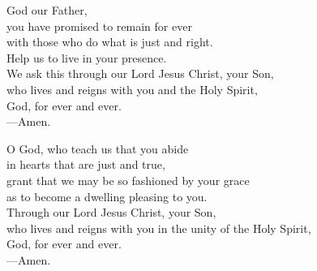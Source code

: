\prayer


\begin{prayerverse}
God our Father,\\
you have promised to remain for ever\\
with those who do what is just and right.\\
Help us to live in your presence.\\
We ask this through our Lord Jesus Christ, your Son,\\
who lives and reigns with you and the Holy Spirit,\\
God, for ever and ever.\\
{\color{red}---\thinspace}Amen.
\end{prayerverse}


\begin{prayerverse}
O God, who teach us that you abide\\
in hearts that are just and true,\\
grant that we may be so fashioned by your grace\\
as to become a dwelling pleasing to you.\\
Through our Lord Jesus Christ, your Son,\\
who lives and reigns with you in the unity of the Holy Spirit,\\
God, for ever and ever.\\
{\color{red}---\thinspace}Amen.
\end{prayerverse}

